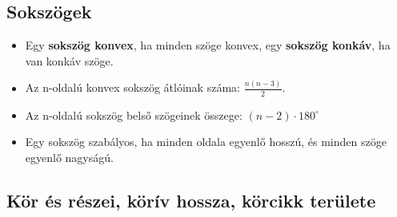 \documentclass[a4paper,11pt]{article}
\begin{document}
\subsection*{Sokszögek}
\begin{itemize}
\item Egy \textbf{sokszög konvex}, ha minden szöge konvex, egy \textbf{sokszög konkáv}, ha van konkáv szöge.
\item Az n-oldalú konvex sokszög átlóinak száma: $\frac{n(n-3)}{2}$.
\item Az n-oldalú sokszög belső szögeinek összege: $(n-2) \cdot 180^\circ$
\item Egy sokszög szabályos, ha minden oldala egyenlő hosszú, és minden szöge egyenlő nagyságú.
\end{itemize}
\subsection*{Kör és részei, körív hossza, körcikk területe}
\end{document}
